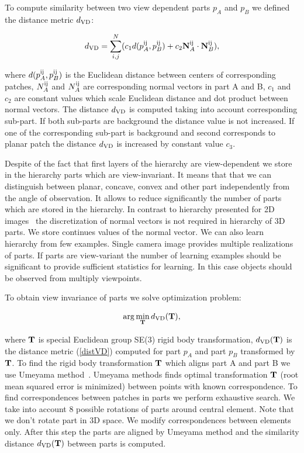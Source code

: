 \documentclass[letterpaper,10pt,conference]{ieeeconf}  %
\begin{document}
To compute similarity between two view dependent parts $p_A$ and $p_B$ we defined the distance metric $d_{\rm VD}$:

\begin{equation}
\label{distVD}
 d_{\rm VD}=\sum_{i,j}^N ( c_1 d(p_A^{\rm ij}, p_B^{\rm ij}) + c_2 {\bf N}_A^{\rm ij} \cdot {\bf N}_B^{\rm ij}),
\end{equation}

where $d(p_A^{\rm ij}, p_B^{\rm ij})$ is the Euclidean distance between centers of corresponding patches, $N_A^{\rm ij}$ and $N_A^{\rm ij}$ are corresponding normal vectors in part A and B, $c_1$ and $c_2$ are constant values which scale Euclidean distance and dot product between normal vectors. The distance $d_{\rm VD}$ is computed taking into account corresponding sub-part. If both sub-parts are background the distance value is not increased. If one of the corresponding sub-part is background and second corresponds to planar patch the distance $d_{\rm VD}$ is increased by constant value $c_3$.

Despite of the fact that first layers of the hierarchy are view-dependent we store in the hierarchy parts which are view-invariant. It means that that we can distinguish between planar, concave, convex and other part independently from the angle of observation. It allows to reduce significantly the number of parts which are stored in the hierarchy. In contrast to hierarchy presented for 2D images~\cite{Fiedler2014} the discretization of normal vectors is not required in hierarchy of 3D parts. We store continues values of the normal vector. We can also learn hierarchy from few examples. Single camera image provides multiple realizations of parts. If parts are view-variant the number of learning examples should be significant to provide sufficient statistics for learning. In this case objects should be observed from multiply viewpoints.

To obtain view invariance of parts we solve optimization problem:

\begin{equation}
\label{optVI}
 \arg\min_{\bf T} d_{\rm VD}({\bf T}),
\end{equation}

where ${\bf T}$ is special Euclidean group SE(3) rigid body transformation, $d_{\rm VD}({\bf T})$ is the distance metric (\ref{distVD}) computed for part $p_A$ and part $p_B$ transformed by ${\bf T}$. To find the rigid body transformation ${\bf T}$ which aligns part A and part B we use Umeyama method~\cite{Umeyama1991}. Umeyama methods finds optimal transformation ${\bf T}$ (root mean squared error is minimized) between points with known correspondence. To find correspondences between patches in parts we perform exhaustive search. We take into account 8 possible rotations of parts around central element. Note that we don't rotate part in 3D space. We modify correspondences between elements only. After this step the parts are aligned by Umeyama method and the similarity distance $d_{\rm VD}({\bf T})$ between parts is computed. 
\end{document}
